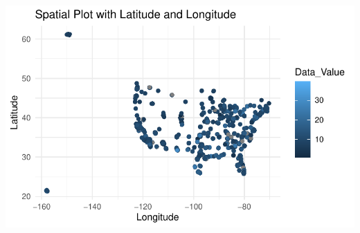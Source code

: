 \documentclass[
  letterpaper,
  DIV=11,
  numbers=noendperiod]{scrartcl}
\newenvironment{Shaded}{\begin{snugshade}}{\end{snugshade}}
\newcommand{\NormalTok}[1]{\textcolor[rgb]{0.00,0.23,0.31}{#1}}
\newcommand{\SpecialCharTok}[1]{\textcolor[rgb]{0.37,0.37,0.37}{#1}}
\begin{document}
\includegraphics{arka_analysis_files/figure-pdf/unnamed-chunk-7-1.pdf}

\begin{Shaded}
\end{Shaded}
\end{document}

